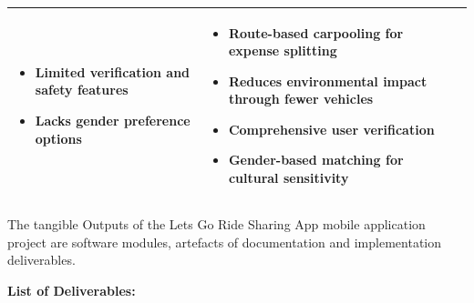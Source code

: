 \begin{table}[htbp]
\begin{tabularx}{\textwidth}{|p{3cm}|X|X|}
\begin{itemize}[leftmargin=*, noitemsep, topsep=0pt]
    \item Limited verification and safety features
    \item Lacks gender preference options
\end{itemize}
&
\begin{itemize}[leftmargin=*, noitemsep, topsep=0pt]
    \item Route-based carpooling for expense splitting
    \item Reduces environmental impact through fewer vehicles
    \item Comprehensive user verification
    \item Gender-based matching for cultural sensitivity
\end{itemize}
\\
\hline
\end{tabularx}
\end{table}


The tangible Outputs of the Lets Go Ride Sharing App mobile application project are software modules, artefacts of documentation and implementation deliverables.

\textbf{List of Deliverables:}


